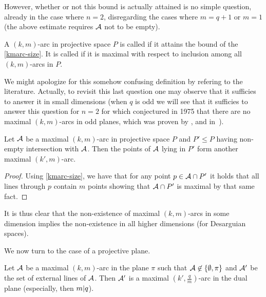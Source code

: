 However, whether or not this bound is actually attained is no simple question, already in the case where $n=2$, disregarding the cases where $m=q+1$ or $m=1$ (the above estimate requires $\mathcal{A}$ not to be empty).

\begin{definition}\label{kmarc-def}
    A $(k,m)$-arc in projective space $P$ is called  if it attains the bound of the \autoref{kmarc-size}.
    It is called  if it is maximal with respect to inclusion among all $(k,m)$-arcs in $P$.
\end{definition}

We might apologize for this somehow confusing definition by refering to the literature. Actually, to revisit this last question one
may observe that it sufficies to answer it in small dimensions (when $q$ is odd we will see that it sufficies to answer this question for $n=2$ for which  conjectured in 1975 that there are no maximal $(k,m)$-arcs in odd planes, which was proven by ,  and  in~\cite{ball1997maxkmarcs}).

\begin{lemma}
    Let $\mathcal{A}$ be a maximal $(k,m)$-arc in projective space $P$ and $P'\leq P$ having non-empty intersection with $\mathcal{A}$. Then the points of $\mathcal{A}$ lying in $P'$ form another maximal $(k',m)$-arc.
\end{lemma}

\begin{proof}
    Using \autoref{kmarc-size}, we have that for any point $p\in \mathcal{A}\cap P'$ it holds that all lines through $p$ contain $m$ points showing that $\mathcal{A}\cap P'$ is maximal by that same fact.
\end{proof}

It is thus clear that the non-existence of maximal $(k,m)$-arcs in some dimension implies the non-existence in all higher dimensions (for Desarguian spaces).

We now turn to the case of a projective plane.

\begin{lemma}\label{kmarc-dual}
    Let $\mathcal{A}$ be a maximal $(k,m)$-arc in the plane $\pi$ such that $\cA\not\in\set{\emptyset,\pi}$ and $\mathcal{A}'$ be the set of external lines of $\mathcal{A}$. Then $\mathcal{A}'$ is a maximal $(k',\frac{q}{m})$-arc in the dual plane (especially, then $m| q$).
\end{lemma}


